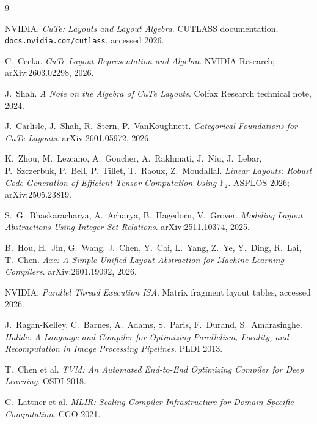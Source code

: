 \begin{thebibliography}{9}

NVIDIA. \emph{CuTe: Layouts and Layout Algebra}. CUTLASS documentation,
\texttt{docs.nvidia.com/cutlass}, accessed 2026.

C.~Cecka. \emph{CuTe Layout Representation and Algebra}. NVIDIA Research;
arXiv:2603.02298, 2026.

J.~Shah. \emph{A Note on the Algebra of CuTe Layouts}. Colfax Research
technical note, 2024.

J.~Carlisle, J.~Shah, R.~Stern, P.~VanKoughnett.
\emph{Categorical Foundations for CuTe Layouts}. arXiv:2601.05972, 2026.

K.~Zhou, M.~Lezcano, A.~Goucher, A.~Rakhmati, J.~Niu, J.~Lebar, P.~Szczerbuk,
P.~Bell, P.~Tillet, T.~Raoux, Z.~Moudallal. \emph{Linear Layouts: Robust Code
Generation of Efficient Tensor Computation Using $\mathbb{F}_2$}. ASPLOS 2026;
arXiv:2505.23819.

S.~G.~Bhaskaracharya, A.~Acharya, B.~Hagedorn, V.~Grover. \emph{Modeling
Layout Abstractions Using Integer Set Relations}. arXiv:2511.10374, 2025.

B.~Hou, H.~Jin, G.~Wang, J.~Chen, Y.~Cai, L.~Yang, Z.~Ye, Y.~Ding, R.~Lai,
T.~Chen. \emph{Axe: A Simple Unified Layout Abstraction for Machine Learning
Compilers}. arXiv:2601.19092, 2026.

NVIDIA. \emph{Parallel Thread Execution ISA}. Matrix fragment layout tables,
accessed 2026.

J.~Ragan-Kelley, C.~Barnes, A.~Adams, S.~Paris, F.~Durand, S.~Amarasinghe.
\emph{Halide: A Language and Compiler for Optimizing Parallelism, Locality,
and Recomputation in Image Processing Pipelines}. PLDI 2013.

T.~Chen et al. \emph{TVM: An Automated End-to-End Optimizing Compiler for
Deep Learning}. OSDI 2018.

C.~Lattner et al. \emph{MLIR: Scaling Compiler Infrastructure for Domain
Specific Computation}. CGO 2021.

\end{thebibliography}
